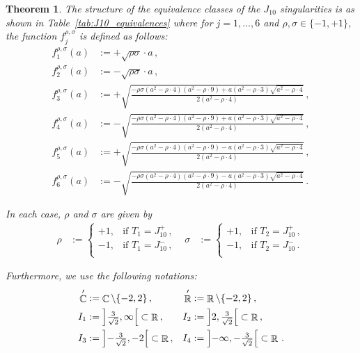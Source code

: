\documentclass[noend]{amsproc}
\newtheorem{theorem}{Theorem}
\theoremstyle{definition}
\let\originalleft\left
\let\originalright\right
\renewcommand{\left}{\mathopen{}\mathclose\bgroup\originalleft}
\renewcommand{\right}{\aftergroup\egroup\originalright}
\DeclareMathOperator{\R}{\mathbb{R}}
\DeclareMathOperator{\C}{\mathbb{C}}
\begin{document}
\begin{theorem}\label{thm:J10}
The structure of the equivalence classes of the $J_{10}$ singularities is as
shown in Table~\ref{tab:J10_equivalences} where for $j = 1, \ldots, 6$ and
$\rho, \sigma \in \{-1, +1\}$, the function $f_j^{\rho, \sigma}$ is defined as
follows:
\begin{align*}
f_1^{\rho, \sigma}(a) &:= +\sqrt{\rho \sigma} \cdot a \,, \\
f_2^{\rho, \sigma}(a) &:= -\sqrt{\rho \sigma} \cdot a \,, \\
f_3^{\rho, \sigma}(a)
&:= + \sqrt{\frac{-\rho \sigma (a^2-\rho \cdot 4) (a^2-\rho \cdot 9)
    + a (a^2-\rho \cdot 3) \sqrt{a^2-\rho \cdot 4}}{2(a^2-\rho \cdot 4)}}\,, \\
f_4^{\rho, \sigma}(a)
&:= - \sqrt{\frac{-\rho \sigma (a^2-\rho \cdot 4) (a^2-\rho \cdot 9)
    + a (a^2-\rho \cdot 3) \sqrt{a^2-\rho \cdot 4}}{2(a^2-\rho \cdot 4)}}\,, \\
f_5^{\rho, \sigma}(a)
&:= + \sqrt{\frac{-\rho \sigma (a^2-\rho \cdot 4) (a^2-\rho \cdot 9)
    - a (a^2-\rho \cdot 3) \sqrt{a^2-\rho \cdot 4}}{2(a^2-\rho \cdot 4)}}\,, \\
f_6^{\rho, \sigma}(a)
&:= - \sqrt{\frac{-\rho \sigma (a^2-\rho \cdot 4) (a^2-\rho \cdot 9)
    - a (a^2-\rho \cdot 3) \sqrt{a^2-\rho \cdot 4}}{2(a^2-\rho \cdot 4)}}\,.
\end{align*}

In each case, $\rho$ and $\sigma$ are given by
\begin{align*}
\rho &:=
\begin{cases}
    +1, &\text{if } T_1 = J_{10}^+ \,, \\
    -1, &\text{if } T_1 = J_{10}^- \,, \\
\end{cases}
&\sigma &:=
\begin{cases}
    +1, &\text{if } T_2 = J_{10}^+ \,, \\
    -1, &\text{if } T_2 = J_{10}^- \,. \\
\end{cases}
\end{align*}

Furthermore, we use the following notations:
\begin{align*}
\C'  &:= \C \setminus \{ -2, 2\} \,, &
\R'  &:= \R \setminus \{ -2, 2\} \,, \\
I_1 &:= \left] {\textstyle\frac{3}{\sqrt{2}}}, \infty \right[ \subset \R \,, &
I_2 &:= \left] 2, {\textstyle\frac{3}{\sqrt{2}}} \right[ \subset \R      \,, \\
I_3 &:= \left] {\textstyle-\frac{3}{\sqrt{2}}}, -2 \right[ \subset \R    \,, &
I_4 &:= \left] -\infty, {\textstyle-\frac{3}{\sqrt{2}}} \right[ \subset \R \,.
\end{align*}


\end{theorem}
\end{document}
